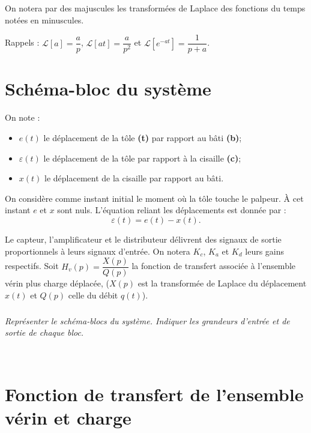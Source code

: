 \documentclass[10pt,fleqn]{article} %
\begin{document}
\begin{multicols}{2}
On notera par des majuscules les transformées de Laplace des fonctions du temps notées en minuscules.

Rappels : $\mathcal{L}\left[a\right]=\dfrac{a}{p}$, $\mathcal{L}\left[at\right]=\dfrac{a}{p^2}$ et $\mathcal{L}\left[e^{-at}\right]=\dfrac{1}{p+a}$. 

\section*{Schéma-bloc du système}
On note : 
\begin{itemize}
\item $e(t)$ le déplacement de la tôle \textbf{(t)} par rapport au bâti \textbf{(b)};
\item $\varepsilon(t)$ le déplacement de la tôle par rapport à la cisaille \textbf{(c)};
\item $x(t)$ le déplacement de la cisaille par rapport au bâti. 
\end{itemize}
On considère comme instant initial le moment où la tôle touche le palpeur. À cet instant $e$ et $x$ sont nuls. L'équation reliant les déplacements est donnée par :
$$\varepsilon(t)=e(t)-x(t).$$


Le capteur, l'amplificateur et le distributeur délivrent des signaux de sortie proportionnels à leurs signaux d'entrée. On notera $K_c$, $K_a$ et $K_d$ leurs gains respectifs. 
Soit  $H_v(p)=\dfrac{X(p)}{Q(p)}$ la fonction de transfert associée à l'ensemble vérin plus charge déplacée, ($X(p)$ est la transformée de Laplace du déplacement $x(t)$ et $Q(p)$ celle du débit $q(t)$).

\subparagraph{}\textit{Représenter le schéma-blocs du système. Indiquer les grandeurs d'entrée et de sortie de chaque bloc.}

\begin{corrige}~\\

\begin{center}

\end{center}
\end{corrige}

\section*{Fonction de transfert de l'ensemble vérin et charge}

\end{multicols}
\end{document}
